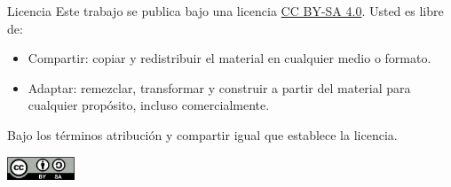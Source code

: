 \documentclass[8pt, t]{beamer}
\begin{document}
\begin{frame}[label={sec:org44b4735}]{Licencia}
Este trabajo se publica bajo una licencia \href{https://creativecommons.org/licenses/by-sa/4.0/}{CC BY-SA 4.0}. Usted es libre de:

\begin{itemize}
\item \alert{Compartir}: copiar y redistribuir el material en cualquier medio o formato.
\item \alert{Adaptar}: remezclar, transformar y construir a partir del material para cualquier propósito, incluso comercialmente.
\end{itemize}

Bajo los términos \alert{atribución} y \alert{compartir igual} que establece la licencia.

\begin{center}
\includegraphics[width=2cm]{core/by-sa.png}
\end{center}
\end{frame}
\end{document}
